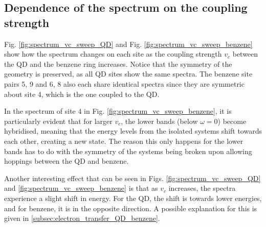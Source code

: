 \subsection{Dependence of the spectrum on the coupling strength}
Fig. \ref{fig:spectrum_vc_sweep_QD} and Fig. \ref{fig:spectrum_vc_sweep_benzene} show how the spectrum changes on each site as the coupling strength $v_c$ between the QD and the benzene ring increases. Notice that the symmetry of the geometry is preserved, as all QD sites show the same spectra. The benzene site pairs 5, 9 and 6, 8 also each share identical spectra since they are symmetric about site 4, which is the one coupled to the QD.
\medskip

In the spectrum of site $4$ in Fig. \ref{fig:spectrum_vc_sweep_benzene}, it is particularly evident that for larger $v_c$, the lower bands (below $\omega=0$) become hybridised, meaning that the energy levels from the isolated systems shift towards each other, creating a new state. The reason this only happens for the lower bands has to do with the symmetry of the systems being broken upon allowing hoppings between the QD and benzene.
\medskip

Another interesting effect that can be seen in Figs. \ref{fig:spectrum_vc_sweep_QD} and \ref{fig:spectrum_vc_sweep_benzene} is that as $v_c$ increases, the spectra experience a slight shift in energy. For the QD, the shift is towards lower energies, and for benzene, it is in the opposite direction. A possible explanation for this is given in \ref{subsec:electron_transfer_QD_benzene}.

